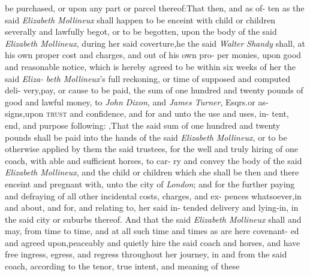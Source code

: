 \documentclass{article}
\begin{document}
\lqq be purchased, or upon any part or\break
\lqq parcel thereof:\tsk  That then, and as of-\break
\lqq ten as the said \textit{Elizabeth Mollineux} shall\break
\lqq happen to be enceint with child or\break
\lqq children severally and lawfully begot,\break
\lqq or to be begotten, upon the body of\break
\lqq the said \textit{Elizabeth Mollineux}, during her\break
\lqq said coverture,\tsk  he the said \textit{Walter}\break
\lqq \textit{Shandy} shall, at his own proper cost\break
\lqq and charges, and out of his own pro-\break
\lqq per monies, upon good and reasonable\break
\lqq notice, which is hereby agreed to be 
\lqq within six weeks of her the said \textit{Eliza-}\break
\lqq \textit{beth Mollineux}’s full reckoning, or\break
\lqq time of supposed and computed deli-\break
\lqq very,\tsk  pay, or cause to be paid, the\break
\lqq sum of one hundred and twenty pounds\break
\lqq of good and lawful money, to \textit{John}\break
\lqq \textit{Dixon}, and \textit{James Turner}, Esqrs.\@ or as-\break
\lqq signs,\tsk  upon \textsc{trust} and confidence,\break
\lqq and for and unto the use and uses, in-\break
\lqq tent, end, and purpose following:\tsk\break
\lqq {}\hbox{},\tsk  That the said sum\break
\lqq of one hundred and twenty pounds\break
\lqq shall be paid into the hands of the said\break
\lqq \textit{Elizabeth Mollineux}, or to be otherwise\break
\lqq applied by them the said trustees, for\break
\lqq the well and truly hiring of one coach,\break
\lqq with able and sufficient horses, to car-\break
\lqq ry and convey the body of the said\break
\lqq \textit{Elizabeth Mollineux}, and the child or\break
\lqq children which she shall be then and\break
\lqq there enceint and pregnant with,\tsk{}
\lqq unto the city of \textit{London}; and for the\break
\lqq further paying and defraying of all\break
\lqq other incidental costs, charges, and ex-\break
\lqq pences whatsoever,\tsk  in and about,\break
\lqq and for, and relating to, her said in-\break
\lqq tended delivery and lying-in, in the\break
\lqq said city or suburbs thereof. And that\break
\lqq the said \textit{Elizabeth Mollineux} shall and\break
\lqq may, from time to time, and at all such\break
\lqq time and times as are here covenant-\break
\lqq ed and agreed upon,\tsk  peaceably and\break
\lqq quietly hire the said coach and horses,\break
\lqq and have free ingress, egress, and\break
\lqq regress throughout her journey, in and\break
\lqq from the said coach, according to the\break
\lqq tenor, true intent, and meaning of these\break
\end{document}
